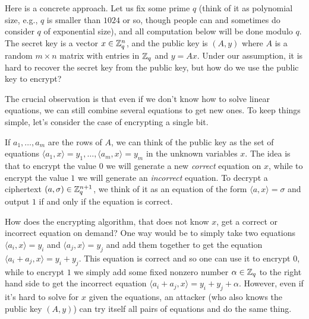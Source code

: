 Here is a concrete approach. Let us fix some prime \(q\) (think of it as
polynomial size, e.g., \(q\) is smaller than \(1024\) or so, though
people can and sometimes do consider \(q\) of exponential size), and all
computation below will be done modulo \(q\). The secret key is a vector
\(x\in{\mathbb{Z}}_q^n\), and the public key is \((A,y)\) where \(A\) is a random
\(m\times n\) matrix with entries in \({\mathbb{Z}}_q\) and \(y=Ax\). Under our
assumption, it is hard to recover the secret key from the public key,
but how do we use the public key to encrypt?

The crucial observation is that even if we don't know how to solve
linear equations, we can still combine several equations to get new
ones. To keep things simple, let's consider the case of encrypting a
single bit.


If \(a_1,\ldots,a_m\) are the rows of \(A\), we can think of the public
key as the set of equations
\(\langle a_1,x \rangle=y_1,\ldots, \langle a_m,x \rangle=y_m\) in the
unknown variables \(x\). The idea is that to encrypt the value \(0\) we
will generate a new \emph{correct} equation on \(x\), while to encrypt
the value \(1\) we will generate an \emph{incorrect} equation. To
decrypt a ciphertext \((a,\sigma)\in {\mathbb{Z}}_q^{n+1}\), we think of it as an
equation of the form \(\langle a,x \rangle=\sigma\) and output \(1\) if
and only if the equation is correct.

How does the encrypting algorithm, that does not know \(x\), get a
correct or incorrect equation on demand? One way would be to simply take
two equations \(\langle a_i,x \rangle=y_i\) and
\(\langle a_j,x \rangle=y_j\) and add them together to get the equation
\(\langle a_i+a_j,x \rangle=y_i+y_j\). This equation is correct and so
one can use it to encrypt \(0\), while to encrypt \(1\) we simply add
some fixed nonzero number \(\alpha\in{\mathbb{Z}}_q\) to the right hand side to
get the incorrect equation
\(\langle a_i+a_j,x \rangle= y_i+y_j + \alpha\). However, even if it's
hard to solve for \(x\) given the equations, an attacker (who also knows
the public key \((A,y)\)) can try itself all pairs of equations and do
the same thing.

